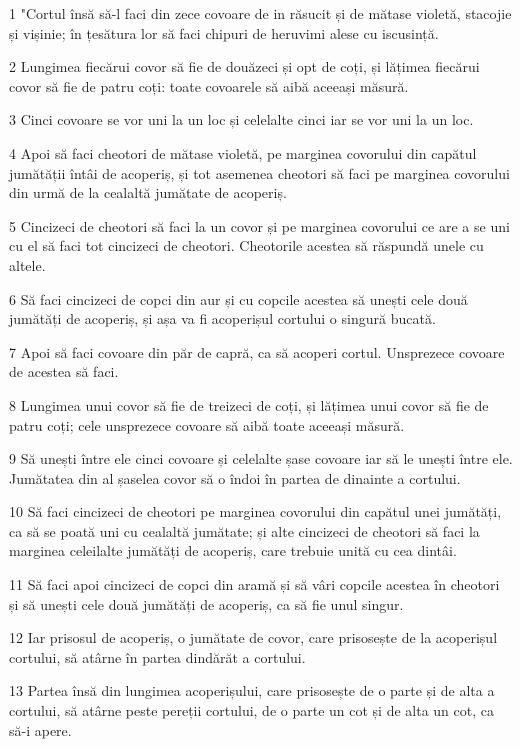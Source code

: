 \par 1 "Cortul însă să-l faci din zece covoare de in răsucit și de mătase violetă, stacojie și vișinie; în țesătura lor să faci chipuri de heruvimi alese cu iscusință.
\par 2 Lungimea fiecărui covor să fie de douăzeci și opt de coți, și lățimea fiecărui covor să fie de patru coți: toate covoarele să aibă aceeași măsură.
\par 3 Cinci covoare se vor uni la un loc și celelalte cinci iar se vor uni la un loc.
\par 4 Apoi să faci cheotori de mătase violetă, pe marginea covorului din capătul jumătății întâi de acoperiș, și tot asemenea cheotori să faci pe marginea covorului din urmă de la cealaltă jumătate de acoperiș.
\par 5 Cincizeci de cheotori să faci la un covor și pe marginea covorului ce are a se uni cu el să faci tot cincizeci de cheotori. Cheotorile acestea să răspundă unele cu altele.
\par 6 Să faci cincizeci de copci din aur și cu copcile acestea să unești cele două jumătăți de acoperiș, și așa va fi acoperișul cortului o singură bucată.
\par 7 Apoi să faci covoare din păr de capră, ca să acoperi cortul. Unsprezece covoare de acestea să faci.
\par 8 Lungimea unui covor să fie de treizeci de coți, și lățimea unui covor să fie de patru coți; cele unsprezece covoare să aibă toate aceeași măsură.
\par 9 Să unești între ele cinci covoare și celelalte șase covoare iar să le unești între ele. Jumătatea din al șaselea covor să o îndoi în partea de dinainte a cortului.
\par 10 Să faci cincizeci de cheotori pe marginea covorului din capătul unei jumătăți, ca să se poată uni cu cealaltă jumătate; și alte cincizeci de cheotori să faci la marginea celeilalte jumătăți de acoperiș, care trebuie unită cu cea dintâi.
\par 11 Să faci apoi cincizeci de copci din aramă și să vâri copcile acestea în cheotori și să unești cele două jumătăți de acoperiș, ca să fie unul singur.
\par 12 Iar prisosul de acoperiș, o jumătate de covor, care prisosește de la acoperișul cortului, să atârne în partea dindărăt a cortului.
\par 13 Partea însă din lungimea acoperișului, care prisosește de o parte și de alta a cortului, să atârne peste pereții cortului, de o parte un cot și de alta un cot, ca să-i apere.
